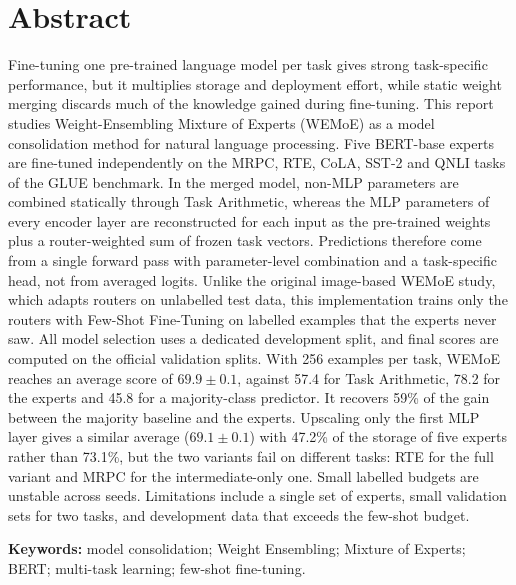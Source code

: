 \chapter*{Abstract}

Fine-tuning one pre-trained language model per task gives strong task-specific performance, but it multiplies storage and deployment effort, while static weight merging discards much of the knowledge gained during fine-tuning. This report studies Weight-Ensembling Mixture of Experts (WEMoE) as a model consolidation method for natural language processing. Five BERT-base experts are fine-tuned independently on the MRPC, RTE, CoLA, SST-2 and QNLI tasks of the GLUE benchmark. In the merged model, non-MLP parameters are combined statically through Task Arithmetic, whereas the MLP parameters of every encoder layer are reconstructed for each input as the pre-trained weights plus a router-weighted sum of frozen task vectors. Predictions therefore come from a single forward pass with parameter-level combination and a task-specific head, not from averaged logits. Unlike the original image-based WEMoE study, which adapts routers on unlabelled test data, this implementation trains only the routers with Few-Shot Fine-Tuning on labelled examples that the experts never saw. All model selection uses a dedicated development split, and final scores are computed on the official validation splits. With 256 examples per task, WEMoE reaches an average score of $69.9\pm0.1$, against 57.4 for Task Arithmetic, 78.2 for the experts and 45.8 for a majority-class predictor. It recovers 59\% of the gain between the majority baseline and the experts. Upscaling only the first MLP layer gives a similar average ($69.1\pm0.1$) with 47.2\% of the storage of five experts rather than 73.1\%, but the two variants fail on different tasks: RTE for the full variant and MRPC for the intermediate-only one. Small labelled budgets are unstable across seeds. Limitations include a single set of experts, small validation sets for two tasks, and development data that exceeds the few-shot budget.

\vspace{3mm}
\noindent\textbf{Keywords:} model consolidation; Weight Ensembling; Mixture of Experts; BERT; multi-task learning; few-shot fine-tuning.
